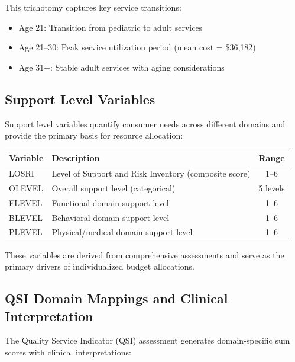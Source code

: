 This trichotomy captures key service transitions:
\begin{itemize}
    \item Age 21: Transition from pediatric to adult services
    \item Age 21--30: Peak service utilization period (mean cost = \$36,182)
    \item Age 31+: Stable adult services with aging considerations
\end{itemize}

\subsection{Support Level Variables}

Support level variables quantify consumer needs across different domains and provide the primary basis for resource allocation:

\begin{center}
\begin{tabular}{|l|p{8cm}|c|}
\hline
\textbf{Variable} & \textbf{Description} & \textbf{Range} \\
\hline
LOSRI & Level of Support and Risk Inventory (composite score) & 1--6 \\
\hline
OLEVEL & Overall support level (categorical) & 5 levels \\
\hline
FLEVEL & Functional domain support level & 1--6 \\
\hline
BLEVEL & Behavioral domain support level & 1--6 \\
\hline
PLEVEL & Physical/medical domain support level & 1--6 \\
\hline
\end{tabular}
\end{center}

These variables are derived from comprehensive assessments and serve as the primary drivers of individualized budget allocations.

\subsection{QSI Domain Mappings and Clinical Interpretation}

The Quality Service Indicator (QSI) assessment generates domain-specific sum scores with clinical interpretations:

